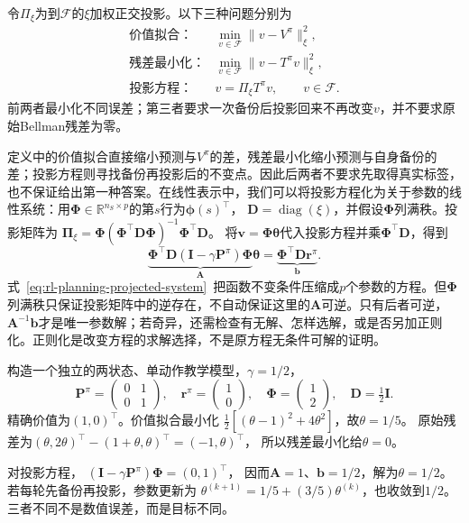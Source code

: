 \begin{definition}[三种近似评价对象]
 \label{def:rl-planning-projected-evaluation}
 令$\Pi_\xi$为到$\mathcal F$的$\xi$加权正交投影。以下三种问题分别为
 \[
 \begin{array}{ll}
 \text{价值拟合：}&\displaystyle\min_{v\in\mathcal F}\lVert v-V^\pi\rVert_\xi^2,\\
 \text{残差最小化：}&\displaystyle\min_{v\in\mathcal F}\lVert v-T^\pi v\rVert_\xi^2,\\
 \text{投影方程：}&v=\Pi_\xi T^\pi v,\qquad v\in\mathcal F.
 \end{array}
 \]
 前两者最小化不同误差；第三者要求一次备份后投影回来不再改变$v$，并不要求原始Bellman残差为零。
\end{definition}

定义中的价值拟合直接缩小预测与$V^\pi$的差，残差最小化缩小预测与自身备份的差；投影方程则寻找备份再投影后的不变点。因此后两者不要求先取得真实标签，也不保证给出第一种答案。在线性表示中，我们可以将投影方程化为关于参数的线性系统：用$\bm\Phi\in\mathbb R^{n_S\times p}$的第$s$行为$\bm\phi(s)^\top$，
$\bm D=\operatorname{diag}(\xi)$，并假设$\bm\Phi$列满秩。投影矩阵为
$\bm\Pi_\xi=\bm\Phi(\bm\Phi^\top\bm D\bm\Phi)^{-1}\bm\Phi^\top\bm D$。
将$\bm v=\bm\Phi\bm\theta$代入投影方程并乘$\bm\Phi^\top\bm D$，得到
\begin{equation}
 \underbrace{\bm\Phi^\top\bm D(\bm I-\gamma\bm P^\pi)\bm\Phi}_{\bm A}
 \bm\theta
 =\underbrace{\bm\Phi^\top\bm D\bm r^\pi}_{\bm b}.
 \label{eq:rl-planning-projected-system}
\end{equation}
式~\eqref{eq:rl-planning-projected-system}~把函数不变条件压缩成$p$个参数的方程。但$\bm\Phi$列满秩只保证投影矩阵中的逆存在，不自动保证这里的$\bm A$可逆。只有后者可逆，$\bm A^{-1}\bm b$才是唯一参数解；若奇异，还需检查有无解、怎样选解，或是否另加正则化。正则化是改变方程的求解选择，不是原方程无条件可解的证明。

\begin{example}[同一特征的三种答案]
 \label{ex:rl-planning-projection}
 构造一个独立的两状态、单动作教学模型，$\gamma=1/2$，
 \[
 \bm P^\pi=\begin{pmatrix}0&1\\0&1\end{pmatrix},\quad
 \bm r^\pi=\begin{pmatrix}1\\0\end{pmatrix},\quad
 \bm\Phi=\begin{pmatrix}1\\2\end{pmatrix},\quad
 \bm D=\tfrac12\bm I.
 \]
 精确价值为$(1,0)^\top$。价值拟合最小化
 $\tfrac12[(\theta-1)^2+4\theta^2]$，故$\theta=1/5$。
 原始残差为$(\theta,2\theta)^\top-(1+\theta,\theta)^\top=(-1,\theta)^\top$，
 所以残差最小化给$\theta=0$。

 对投影方程，
 $(\bm I-\gamma\bm P^\pi)\bm\Phi=(0,1)^\top$，
 因而$\bm A=1$、$\bm b=1/2$，解为$\theta=1/2$。
 若每轮先备份再投影，参数更新为
 $\theta^{(k+1)}=1/5+(3/5)\theta^{(k)}$，也收敛到$1/2$。
 三者不同不是数值误差，而是目标不同。
\end{example}

